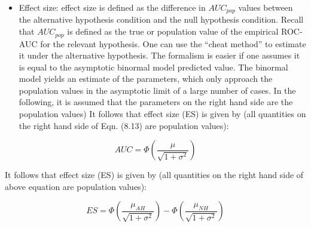 \documentclass[
]{book}
\providecommand{\tightlist}{%
  \setlength{\itemsep}{0pt}\setlength{\parskip}{0pt}}
\begin{document}
\begin{itemize}
\tightlist
\item
  Effect size: effect size is defined as the difference in \(AUC_{pop}\) values between the alternative hypothesis condition and the null hypothesis condition. Recall that \(AUC_{pop}\) is defined as the true or population value of the empirical ROC-AUC for the relevant hypothesis. One can use the ``cheat method'' to estimate it under the alternative hypothesis. The formalism is easier if one assumes it is equal to the asymptotic binormal model predicted value. The binormal model yields an estimate of the parameters, which only approach the population values in the asymptotic limit of a large number of cases. In the following, it is assumed that the parameters on the right hand side are the population values)
  It follows that effect size (ES) is given by (all quantities on the right hand side of Eqn. (8.13) are population values):
\end{itemize}

\begin{equation*} 
AUC = \Phi\left ( \frac{ \mu }{\sqrt{ 1 + \sigma^2}} \right )
\end{equation*}

It follows that effect size (ES) is given by (all quantities on the right hand side of above equation are population values):

\begin{equation*} 
ES = \Phi\left ( \frac{\mu_{AH}}{\sqrt{1+\sigma^2}} \right ) - \Phi\left ( \frac{\mu_{NH}}{\sqrt{1+\sigma^2}} \right )
\end{equation*}
\end{document}

